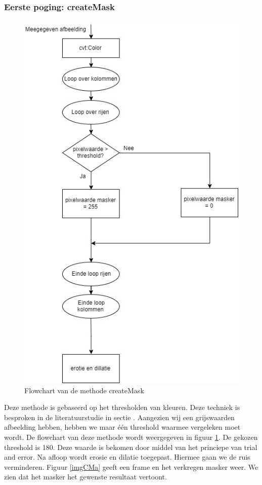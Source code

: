 \subsubsection{Eerste poging: createMask}
\begin{figure}[hbp]
	\includegraphics[scale=0.6]{FlowChart_createMask}
	\caption{Flowchart van de methode createMask}
	\label{imgFSCMa}
\end{figure}
Deze methode is gebaseerd op het thresholden van kleuren. Deze techniek is besproken in de literatuurstudie in sectie \label{refTVK}. Aangezien wij een grijswaarden afbeelding hebben, hebben we maar \'e\'en threshold waarmee vergeleken moet wordt. De flowchart van deze methode wordt weergegeven in figuur \ref{imgFSCMa}. De gekozen threshold is 180. Deze waarde is bekomen door middel van het princiepe van trial and error. Na afloop wordt erosie en dilatie toegepast. Hiermee gaan we de ruis verminderen. Figuur \ref{imgCMa} geeft een frame en het verkregen masker weer. We zien dat het masker het gewenste resultaat vertoont.
